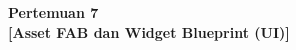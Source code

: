 \documentclass[a4paper,oneside,11pt]{book}
\newcommand{\Pertemuan}{7}
\newcommand{\Materi}{Asset FAB dan Widget Blueprint (UI)}
\begin{document}

\renewcommand{\cfttoctitlefont}{\hfill\normalfont\LARGE\bfseries}
\renewcommand{\cftaftertoctitle}{\hfill}
\renewcommand{\cftbeforetoctitleskip}{1em}
\renewcommand{\cftaftertoctitleskip}{1.5em}

\renewcommand{\cftchappresnum}{Bab~}
\renewcommand{\cftchapaftersnum}{.}
\renewcommand{\cftchapnumwidth}{3.5em}
\renewcommand{\cftchapfont}{\bfseries}
\renewcommand{\cftchappagefont}{\bfseries}

\setlength{\cftbeforechapskip}{0.8em} %
\setlength{\cftbeforesecskip}{0.2em}  %
\renewcommand{\cftsecfont}{\normalfont}
\renewcommand{\cftsubsecfont}{\normalfont}

\renewcommand{\contentsname}{\centering Daftar Isi}
\renewcommand{\listfigurename}{\centering Daftar Gambar}
\renewcommand{\lstlistlistingname}{\centering Daftar Kode}
\renewcommand{\figurename}{Gambar}

\renewcommand{\cftloftitlefont}{\hfill\normalfont\LARGE\bfseries}
\renewcommand{\cftafterloftitle}{\hfill}

\tableofcontents

\newpage
\listoffigures

\newpage
\begin{center}
  \textbf{\LARGE Pertemuan \Pertemuan\\
  {[{\Materi}]}}
\end{center}
\end{document}

